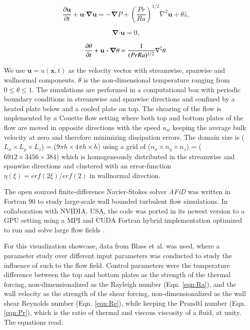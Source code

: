 \documentclass[final,5p,times,twocolumn]{elsarticle}
\begin{document}
\begin{equation} %
\frac{\partial \boldsymbol{u}}{\partial t} + \boldsymbol{u} \bm{\cdot} \bm{\nabla} \boldsymbol{u} =-\bm{\nabla} P + \left(\frac{Pr}{Ra} \right)^{1/2} \nabla^2\boldsymbol{u}+\theta \hat{z}, 
\label{eqn:NS}
\end{equation}

\begin{equation} %
\bm{\nabla} \bm{\cdot} \boldsymbol{u} =0,
\label{eqn:div}
\end{equation}

\begin{equation} %
\frac{\partial \theta}{\partial t} + \boldsymbol{u} \bm{\cdot} \bm{\nabla} \theta = \frac{1}{(Pr Ra)^{1/2}} \nabla ^2 \theta.
\label{eqn:temp} \\[8pt]
\end{equation}

We use $ \boldsymbol{u}=u(\boldsymbol{x},t) $ as the velocity vector with streamwise, spanwise and wallnormal components. $ \theta $ is the non-dimensional temperature ranging from $ 0 \leq \theta \leq 1 $. The simulations are performed in a computational box with periodic boundary conditions in streamwise and spanwise directions and confined by a heated plate below and a cooled plate on top. The shearing of the flow is implemented by a Couette flow setting where both top and bottom plates of the flow are moved in opposite directions with the speed $ u_w $ keeping the average bulk velocity at zero and therefore minimizing dissipation errors. The domain size is ($ L_x \times L_y \times L_z $) = ($ 9\pi h \times 4\pi h \times h $) using a grid of ($ n_x \times n_y \times n_z $) = ($ 6912 \times 3456 \times 384 $) which is homogeneously distributed in the streamwise and spanwise directions and clustered with an error-function $ \eta(\xi)=erf(2\xi)/erf(2) $ in wallnormal direction.

The open sourced finite-difference Navier-Stokes solver \textit{AFiD} \cite{poe15c} was written in Fortran 90 to study large-scale wall bounded turbulent flow simulations. In collaboration with NVIDIA, USA, the code was ported in its newest version to a GPU setting using a MPI and CUDA Fortran hybrid implementation optimized to run and solve large flow fields \cite{zhu18b}.

For this visualization showcase, data from Blass et al. \cite{bla18} was used, where a parameter study over different input parameters was conducted to study the influence of such to the flow field. Control parameters were the temperature difference between the top and bottom plates as the strength of the thermal forcing, non-dimensionalized as the Rayleigh number (Eqn. \ref{eqn:Ra}), and the wall velocity as the strength of the shear forcing, non-dimensionalized as the wall shear Reynolds number (Eqn. \ref{eqn:Re}), while keeping the Prandtl number (Eqn. \ref{eqn:Pr}), which is the ratio of thermal and viscous viscosity of a fluid, at unity. The equations read:
\end{document}
